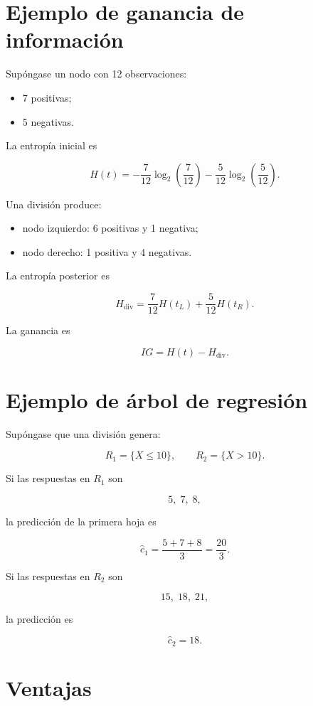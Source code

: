 \documentclass[
  spanish,
  11pt,
  letterpaper,
  DIV=11,
  numbers=noendperiod]{scrreprt}
\providecommand{\tightlist}{%
  \setlength{\itemsep}{0pt}\setlength{\parskip}{0pt}}
\theoremstyle{definition}
\theoremstyle{plain}
\theoremstyle{definition}
\theoremstyle{remark}
\begin{document}
\section{Ejemplo de ganancia de
información}\label{ejemplo-de-ganancia-de-informaciuxf3n}

Supóngase un nodo con 12 observaciones:

\begin{itemize}
\tightlist
\item
  7 positivas;
\item
  5 negativas.
\end{itemize}

La entropía inicial es

\[
H(t)
=
-
\frac{7}{12}\log_2\left(\frac{7}{12}\right)
-
\frac{5}{12}\log_2\left(\frac{5}{12}\right).
\]

Una división produce:

\begin{itemize}
\tightlist
\item
  nodo izquierdo: 6 positivas y 1 negativa;
\item
  nodo derecho: 1 positiva y 4 negativas.
\end{itemize}

La entropía posterior es

\[
H_{\text{div}}
=
\frac{7}{12}H(t_L)
+
\frac{5}{12}H(t_R).
\]

La ganancia es

\[
IG=H(t)-H_{\text{div}}.
\]

\section{Ejemplo de árbol de
regresión}\label{ejemplo-de-uxe1rbol-de-regresiuxf3n}

Supóngase que una división genera:

\[
R_1=\{X\leq 10\},
\qquad
R_2=\{X>10\}.
\]

Si las respuestas en \(R_1\) son

\[
5,\;7,\;8,
\]

la predicción de la primera hoja es

\[
\widehat{c}_1
=
\frac{5+7+8}{3}
=
\frac{20}{3}.
\]

Si las respuestas en \(R_2\) son

\[
15,\;18,\;21,
\]

la predicción es

\[
\widehat{c}_2=18.
\]

\section{Ventajas}\label{ventajas-1}
\end{document}

